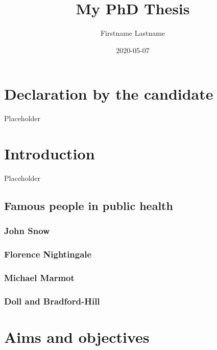 \documentclass[12pt,]{book}
\title{My PhD Thesis}
\subtitle{Firstname Lastname}
\author{Submitted in accordance with the requirements \and for the degree of Doctor of Philosophy \and  \and London School of Hygiene and Tropical Medicine}
\date{2020-05-07}
\begin{document}
\maketitle

\hypertarget{declaration-by-the-candidate}{%
\chapter*{Declaration by the candidate}\label{declaration-by-the-candidate}}

Placeholder

\hypertarget{intro}{%
\chapter{Introduction}\label{intro}}

Placeholder

\hypertarget{famous-people-in-public-health}{%
\section{Famous people in public health}\label{famous-people-in-public-health}}

\hypertarget{john-snow}{%
\subsection{John Snow}\label{john-snow}}

\hypertarget{florence-nightingale}{%
\subsection{Florence Nightingale}\label{florence-nightingale}}

\hypertarget{michael-marmot}{%
\subsection{Michael Marmot}\label{michael-marmot}}

\hypertarget{doll-and-bradford-hill}{%
\subsection{Doll and Bradford-Hill}\label{doll-and-bradford-hill}}

\hypertarget{aims-and-objectives}{%
\chapter{Aims and objectives}\label{aims-and-objectives}}
\end{document}
